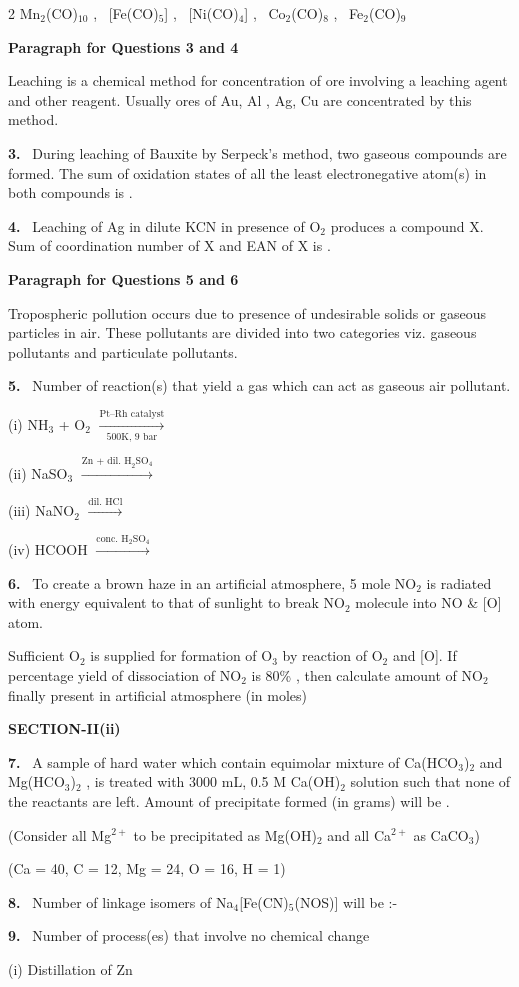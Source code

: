 \documentclass[10pt]{extarticle}
\newcommand{\sect}[1]{\par\smallskip\noindent\textbf{#1}\par}
\newcommand{\qn}[1]{\par\smallskip\noindent\textbf{#1.}~}
\newcommand{\paraq}[2]{\par\smallskip\noindent\textbf{Paragraph for Questions #1 and #2}\par}
\begin{document}
\begin{multicols}{2}
Mn$_2$(CO)$_{10}$ , \ [Fe(CO)$_5$] , \ [Ni(CO)$_4$] , \ Co$_2$(CO)$_8$ , \ Fe$_2$(CO)$_9$
\paraq{3}{4}
Leaching is a chemical method for concentration of ore involving a leaching agent and other reagent. Usually ores of Au, Al , Ag, Cu are concentrated by this method.
\qn{3} During leaching of Bauxite by Serpeck's method, two gaseous compounds are formed. The sum of oxidation states of all the least electronegative atom(s) in both compounds is \underline{\hspace{1cm}}.
\qn{4} Leaching of Ag in dilute KCN in presence of O$_2$ produces a compound X. Sum of coordination number of X and EAN of X is \underline{\hspace{1cm}}.
\paraq{5}{6}
Tropospheric pollution occurs due to presence of undesirable solids or gaseous particles in air. These pollutants are divided into two categories viz. gaseous pollutants and particulate pollutants.
\qn{5} Number of reaction(s) that yield a gas which can act as gaseous air pollutant.\par
(i) NH$_3$ + O$_2$ $\xrightarrow[\text{500K, 9 bar}]{\text{Pt--Rh catalyst}}$\par
(ii) NaSO$_3$ $\xrightarrow{\text{Zn + dil. H}_2\text{SO}_4}$\par
(iii) NaNO$_2$ $\xrightarrow{\text{dil. HCl}}$\par
(iv) HCOOH $\xrightarrow{\text{conc. H}_2\text{SO}_4}$
\qn{6} To create a brown haze in an artificial atmosphere, 5 mole NO$_2$ is radiated with energy equivalent to that of sunlight to break NO$_2$ molecule into NO \& [O] atom.\par
Sufficient O$_2$ is supplied for formation of O$_3$ by reaction of O$_2$ and [O]. If percentage yield of dissociation of NO$_2$ is 80\% , then calculate amount of NO$_2$ finally present in artificial atmosphere (in moles)
\sect{SECTION-II(ii)}
\qn{7} A sample of hard water which contain equimolar mixture of Ca(HCO$_3$)$_2$ and Mg(HCO$_3$)$_2$ , is treated with 3000 mL, 0.5 M Ca(OH)$_2$ solution such that none of the reactants are left. Amount of precipitate formed (in grams) will be \underline{\hspace{1cm}}.\par
(Consider all Mg$^{2+}$ to be precipitated as Mg(OH)$_2$ and all Ca$^{2+}$ as CaCO$_3$)\par
(Ca = 40, C = 12, Mg = 24, O = 16, H = 1)
\qn{8} Number of linkage isomers of Na$_4$[Fe(CN)$_5$(NOS)] will be :-
\qn{9} Number of process(es) that involve no chemical change\par
(i) Distillation of Zn\par

\end{multicols}
\end{document}
